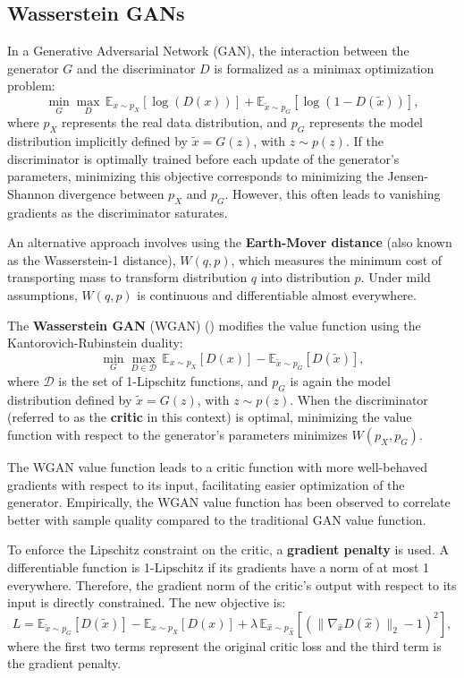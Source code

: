 \subsection{Wasserstein GANs}

In a Generative Adversarial Network (GAN),
the interaction between the generator \( G \) and the discriminator
\( D \) is formalized as a minimax optimization problem:
\begin{equation}
\min_G \max_D \, \mathbb{E}_{x \sim p_X}[\log(D(x))] + \mathbb{E}_{\tilde{x} \sim p_G}[\log(1 - D(\tilde{x}))],
\end{equation}
where \( p_X \) represents the real data distribution,
and \( p_G \) represents the model distribution implicitly defined by
\(\tilde{x} = G(z)\), with \( z \sim p(z) \). If the discriminator
is optimally trained before each update of the generator's parameters,
minimizing this objective corresponds to minimizing the
Jensen-Shannon divergence between \( p_X \) and \( p_G \).
However, this often leads to vanishing gradients as the discriminator saturates.

An alternative approach involves using the \textbf{Earth-Mover distance}
(also known as the Wasserstein-1 distance),
\( W(q, p) \), which measures the minimum cost of transporting mass
to transform distribution \( q \) into distribution \( p \).
Under mild assumptions, \( W(q, p) \) is continuous and differentiable
almost everywhere.

The \textbf{Wasserstein GAN} (WGAN) (\cite{gulrajani2017}) modifies the value
function using the Kantorovich-Rubinstein duality:
\[
\min_G \max_{D \in \mathcal{D}} \, \mathbb{E}_{x \sim p_X}[D(x)] - \mathbb{E}_{\tilde{x} \sim p_G}[D(\tilde{x})],
\]
where \( \mathcal{D} \) is the set of 1-Lipschitz functions,
and \( p_G \) is again the model distribution defined by \(\tilde{x} = G(z)\),
with \( z \sim p(z) \). When the discriminator (referred to as the \textbf{critic}
in this context) is optimal, minimizing the value function with respect
to the generator's parameters minimizes \( W(p_X, p_G) \).

The WGAN value function leads to a critic function with more well-behaved
gradients with respect to its input, facilitating easier optimization
of the generator. Empirically, the WGAN value function has been observed
to correlate better with sample quality compared to the traditional GAN value
function.

To enforce the Lipschitz constraint on the critic, a \textbf{gradient penalty}
is used.
A differentiable function is 1-Lipschitz if its gradients have a norm of at most
1 everywhere. Therefore, the gradient norm of the critic's output with respect
to its input is directly constrained. The new objective is:
\[
L = \mathbb{E}_{\tilde{x} \sim p_G}[D(\tilde{x})] - \mathbb{E}_{x \sim p_X}[D(x)] + \lambda \, \mathbb{E}_{\hat{x} \sim p_{\hat{X}}}[(\|\nabla_{\hat{x}} D(\hat{x})\|_2 - 1)^2],
\]
where the first two terms represent the original critic loss and the
third term is the gradient penalty.


